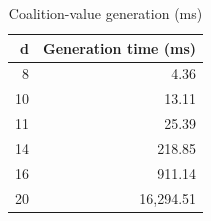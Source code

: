 \begin{table}[htbp]
\centering
\caption{Coalition-value generation (ms)}
\begin{tabular}{rr}
\toprule
d & Generation time (ms) \\
\midrule
8 & 4.36 \\
10 & 13.11 \\
11 & 25.39 \\
14 & 218.85 \\
16 & 911.14 \\
20 & 16,294.51 \\
\bottomrule
\end{tabular}
\end{table}
